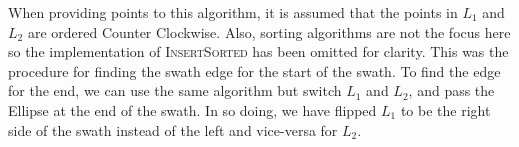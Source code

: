 When providing points to this algorithm, it is assumed that the points in $L_1$
and $L_2$ are ordered Counter Clockwise. Also, sorting algorithms are not the
focus here so the implementation of \textsc{InsertSorted} has been omitted for
clarity.  This was the procedure for finding the swath edge for the start of
the swath.  To find the edge for the end, we can use the same algorithm but
switch $L_1$ and $L_2$, and pass the Ellipse at the end of the swath. In so
doing, we have flipped $L_1$ to be the right side of the swath instead of the
left and vice-versa for $L_2$. 





